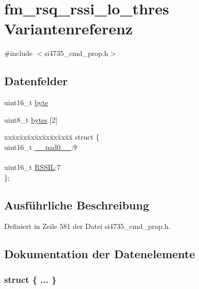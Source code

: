 \hypertarget{unionfm__rsq__rssi__lo__thres}{}\section{fm\+\_\+rsq\+\_\+rssi\+\_\+lo\+\_\+thres Variantenreferenz}
\label{unionfm__rsq__rssi__lo__thres}


{\ttfamily \#include $<$si4735\+\_\+cmd\+\_\+prop.\+h$>$}

\subsection*{Datenfelder}
\begin{DoxyCompactItemize}
\item 
uint16\+\_\+t \hyperlink{unionfm__rsq__rssi__lo__thres_ab0549c1b5ea980a02e7eab77e21fea49}{byte}
\item 
uint8\+\_\+t \hyperlink{unionfm__rsq__rssi__lo__thres_a46e4c05d20a047ec169f60d3167e912e}{bytes} \mbox{[}2\mbox{]}
\item 
\begin{tabbing}
xx\=xx\=xx\=xx\=xx\=xx\=xx\=xx\=xx\=\kill
struct \{\\
\>uint16\_t \hyperlink{unionfm__rsq__rssi__lo__thres_a77132c2c26a75f5b8751b235cda23828}{\_\_pad0\_\_}:9\\
\>\\
\>uint16\_t \hyperlink{unionfm__rsq__rssi__lo__thres_a3486b6704157a7903fdf5db75c248898}{RSSIL}:7\\
\}; \\

\end{tabbing}\end{DoxyCompactItemize}


\subsection{Ausführliche Beschreibung}


Definiert in Zeile 581 der Datei si4735\+\_\+cmd\+\_\+prop.\+h.



\subsection{Dokumentation der Datenelemente}
\hypertarget{unionfm__rsq__rssi__lo__thres_a1d0260379a748a45db2dbc85e116f08c}{}\subsubsection[{"@65}]{\setlength{\rightskip}{0pt plus 5cm}struct \{ ... \} }\label{unionfm__rsq__rssi__lo__thres_a1d0260379a748a45db2dbc85e116f08c}
\hypertarget{unionfm__rsq__rssi__lo__thres_a77132c2c26a75f5b8751b235cda23828}{}
